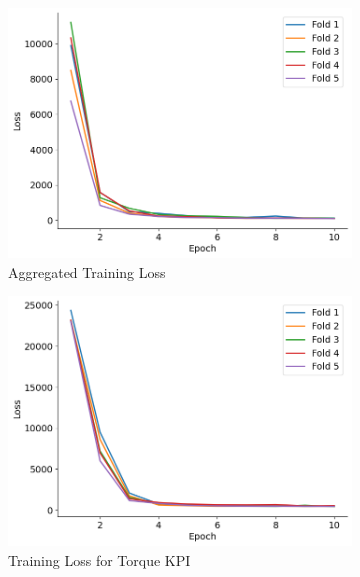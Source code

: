 \documentclass{report} %
\begin{document}
\begin{figure}[H]
    \centering
    \begin{subfigure}{0.32\textwidth}
        \centering
        \includegraphics[width=\textwidth]{./ReportImages/train_loss.png}
        \caption{\centering Aggregated Training Loss}
        \label{fig:Aggregated Training Loss}
    \end{subfigure}\hfill
    \begin{subfigure}{0.32\textwidth}
        \centering
        \includegraphics[width=\textwidth]{./ReportImages/train_loss_y1.png}
        \caption{\centering Training Loss for Torque \ac{KPI}}
        \label{fig:Training Loss for Torque Curve}
    \end{subfigure}\hfill
    \begin{subfigure}{0.32\textwidth}

\end{subfigure}
\end{figure}
\end{document}
